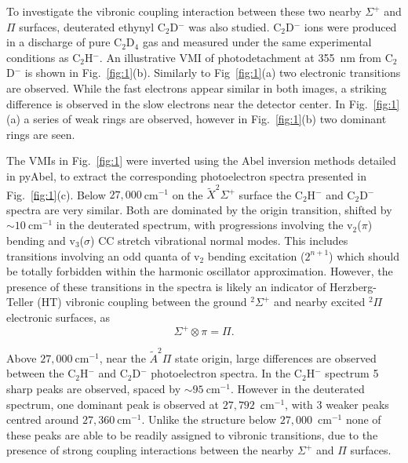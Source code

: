 \documentclass[journal=jpcafh,manuscript=article,layout=onecolumn, 12pt]{achemso}
\begin{document}
To investigate the vibronic coupling interaction between these two nearby $\Sigma^+$ and $\Pi$ surfaces, deuterated ethynyl C$_2$D$^-$ was also studied. C$_2$D$^-$ ions were produced in a discharge of pure C$_2$D$_4$ gas and measured under the same experimental conditions as C$_2$H$^-$. An illustrative VMI of photodetachment at 355~nm from C$_2$D$^-$ is shown in Fig.~\ref{fig:1}(b). Similarly to Fig~\ref{fig:1}(a) two electronic transitions are observed. While the fast electrons appear similar in both images, a striking difference is observed in the slow electrons near the detector center. In Fig.~\ref{fig:1}(a) a series of weak rings are observed, however in Fig.~\ref{fig:1}(b) two dominant rings are seen.

The VMIs in Fig.~\ref{fig:1} were inverted using the Abel inversion methods detailed in pyAbel, to extract the corresponding photoelectron spectra presented in Fig.~\ref{fig:1}(c). Below $27,000~$cm$^{-1}$ on the $\tilde{X} ^2\Sigma^+$ surface the C$_2$H$^-$ and C$_2$D$^-$ spectra are very similar. Both are dominated by the origin transition, shifted by $\sim10~$cm$^{-1}$ in the deuterated spectrum, with progressions involving the v$_2$($\pi$) bending and v$_3$($\sigma$) CC stretch vibrational normal modes. This includes transitions involving an odd quanta of v$_2$ bending excitation ($2^{n+1}$) which should be totally forbidden within the harmonic oscillator approximation. However, the presence of these transitions in the spectra is likely an indicator of Herzberg-Teller (HT) vibronic coupling between the ground $^2\Sigma^+$ and nearby excited $^2\Pi$ electronic surfaces, as
\begin{equation}
\Sigma^+ \otimes \pi = \Pi. 
\end{equation}

Above $27,000~$cm$^{-1}$, near the $\tilde{A}^2\Pi$ state origin, large differences are observed between the C$_2$H$^-$ and C$_2$D$^-$ photoelectron spectra. In the C$_2$H$^-$ spectrum 5 sharp peaks are observed, spaced by $\sim95~$cm$^{-1}$. However in the deuterated spectrum, one dominant peak is observed at $27,792$~cm$^{-1}$, with 3 weaker peaks centred around $27,360~$cm$^{-1}$. Unlike the structure below $27,000$~cm$^{-1}$ none of these peaks are able to be readily assigned to vibronic transitions, due to the presence of strong coupling interactions between the nearby $\Sigma^+$ and $\Pi$ surfaces.
\end{document}
